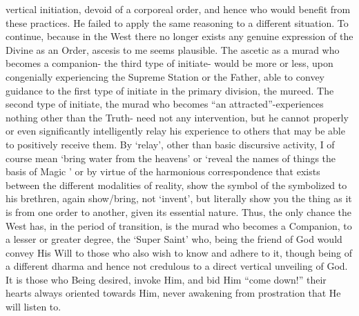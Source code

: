 \begin{footnotesize}
\begin{sffamily}
vertical initiation, devoid of a corporeal order, and hence who would benefit from these practices. He failed to apply the same reasoning to a different situation. To continue, because in the West there no longer exists any genuine expression of the Divine as an Order, ascesis to me seems plausible. The ascetic as a murad who becomes a companion- the third type of initiate- would be more or less, upon congenially experiencing the Supreme Station or the Father, able to convey guidance to the first type of initiate in the primary division, the mureed. The second type of initiate, the murad who becomes ``an attracted''-experiences nothing other than the Truth- need not any intervention, but he cannot properly or even significantly intelligently relay his experience to others that may be able to positively receive them. By `relay', other than basic discursive activity, I of course mean `bring water from the heavens' or `reveal the names of things the basis of Magic ' or by virtue of the harmonious correspondence that exists between the different modalities of reality, show the symbol of the symbolized to his brethren, again show/bring, not `invent', but literally show you the thing as it is from one order to another, given its essential nature. Thus, the only chance the West has, in the period of transition, is the murad who becomes a Companion, to a lesser or greater degree, the `Super Saint' who, being the friend of God would convey His Will to those who also wish to know and adhere to it, though being of a different dharma and hence not credulous to a direct vertical unveiling of God. It is those who Being desired, invoke Him, and bid Him ``come down!'' their hearts always oriented towards Him, never awakening from prostration that He will listen to.


\end{sffamily}
\end{footnotesize}
